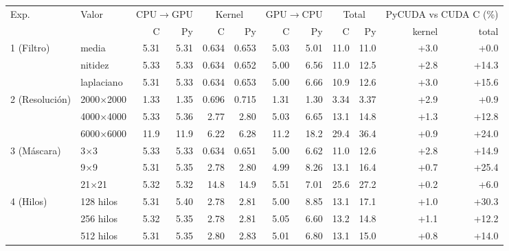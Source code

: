 \begin{tabular}{llrrrrrrrrrr}
\toprule
Exp. & Valor & \multicolumn{2}{c}{CPU$\to$GPU} & \multicolumn{2}{c}{Kernel} & \multicolumn{2}{c}{GPU$\to$CPU} & \multicolumn{2}{c}{Total} & \multicolumn{2}{c}{PyCUDA vs CUDA C (\%)} \\
 & & C & Py & C & Py & C & Py & C & Py & kernel & total \\
\midrule
1 (Filtro) & media & 5.31 & 5.31 & 0.634 & 0.653 & 5.03 & 5.01 & 11.0 & 11.0 & +3.0 & +0.0 \\
 & nitidez & 5.33 & 5.33 & 0.634 & 0.652 & 5.00 & 6.56 & 11.0 & 12.5 & +2.8 & +14.3 \\
 & laplaciano & 5.31 & 5.33 & 0.634 & 0.653 & 5.00 & 6.66 & 10.9 & 12.6 & +3.0 & +15.6 \\
\midrule
2 (Resolución) & 2000$\times$2000 & 1.33 & 1.35 & 0.696 & 0.715 & 1.31 & 1.30 & 3.34 & 3.37 & +2.9 & +0.9 \\
 & 4000$\times$4000 & 5.33 & 5.36 & 2.77 & 2.80 & 5.03 & 6.65 & 13.1 & 14.8 & +1.3 & +12.8 \\
 & 6000$\times$6000 & 11.9 & 11.9 & 6.22 & 6.28 & 11.2 & 18.2 & 29.4 & 36.4 & +0.9 & +24.0 \\
\midrule
3 (Máscara) & 3$\times$3 & 5.33 & 5.33 & 0.634 & 0.651 & 5.00 & 6.62 & 11.0 & 12.6 & +2.8 & +14.9 \\
 & 9$\times$9 & 5.31 & 5.35 & 2.78 & 2.80 & 4.99 & 8.26 & 13.1 & 16.4 & +0.7 & +25.4 \\
 & 21$\times$21 & 5.32 & 5.32 & 14.8 & 14.9 & 5.51 & 7.01 & 25.6 & 27.2 & +0.2 & +6.0 \\
\midrule
4 (Hilos) & 128 hilos & 5.31 & 5.40 & 2.78 & 2.81 & 5.00 & 8.85 & 13.1 & 17.1 & +1.0 & +30.3 \\
 & 256 hilos & 5.32 & 5.35 & 2.78 & 2.81 & 5.05 & 6.60 & 13.2 & 14.8 & +1.1 & +12.2 \\
 & 512 hilos & 5.31 & 5.35 & 2.80 & 2.83 & 5.01 & 6.80 & 13.1 & 15.0 & +0.8 & +14.0 \\
\bottomrule
\end{tabular}
